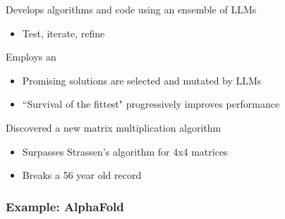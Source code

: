 \begin{frame}
    
    Develops algorithms and code using an ensemble of LLMs

    \vspace{0.5em}
    \begin{itemize}
        \item Test, iterate, refine
    \end{itemize}

    \vspace{0.5em}
    \vspace{0.5em}
    \vspace{0.5em}
    Employs an 

    \vspace{0.5em}
    \begin{itemize}
        \item Promising solutions are selected and mutated by LLMs 
        \vspace{0.5em}
        \item ``Survival of the fittest" progressively improves performance
    \end{itemize}

        \vspace{0.5em}
        \vspace{0.5em}
    Discovered a new matrix multiplication algorithm

    \begin{itemize}
        \item Surpasses Strassen's algorithm for 4x4 matrices
        \vspace{0.5em}
        \item Breaks a 56 year old record
    \end{itemize}

\end{frame}


\begin{frame}\frametitle{Example: AlphaFold}
    
    \begin{figure}
       \centering
    \end{figure}

\end{frame}

